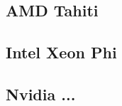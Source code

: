 \section{}
\label{sec:hardware}

\subsection{AMD Tahiti}

\subsection{Intel Xeon Phi}

\subsection{Nvidia ...}
